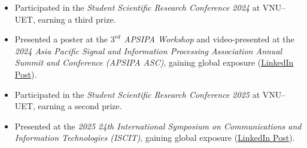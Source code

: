 \documentclass[a4paper,9pt]{extarticle}
\begin{document}

\begin{itemize}
    \item Participated in the \textit{Student Scientific Research Conference 2024} at VNU--UET, earning a third prize.
    \item Presented a poster at the \textit{\(3^{rd}\) APSIPA Workshop} and video-presented at the \textit{2024 Asia Pacific Signal and Information Processing Association Annual Summit and Conference (APSIPA ASC)}, gaining global exposure (\href{https://www.linkedin.com/posts/lam-thai-nguyen_i-am-excited-to-share-that-i-just-attended-activity-7222239726915792896-OiYg?utm_source=share&utm_medium=member_desktop&rcm=ACoAAEinRmcBA3-t9M_YNwI0MWWTH-DvemO6POU}{LinkedIn Post}).
    \item Participated in the \textit{Student Scientific Research Conference 2025} at VNU--UET, earning a second prize.
    \item Presented at the \textit{2025 24th International Symposium on Communications and Information Technologies (ISCIT)}, gaining global exposure (\href{https://www.linkedin.com/posts/lam-thai-nguyen_last-week-i-had-the-opportunity-to-present-activity-7386357390545383424-uVeD?utm_source=share&utm_medium=member_desktop&rcm=ACoAAEinRmcBA3-t9M_YNwI0MWWTH-DvemO6POU}{LinkedIn Post}).
\end{itemize}

\end{document}

